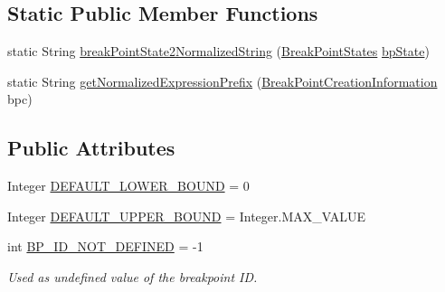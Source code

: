 \subsection*{Static Public Member Functions}
\begin{DoxyCompactItemize}
\item 
static String \hyperlink{classgov_1_1nasa_1_1jpf_1_1inspector_1_1client_1_1commands_1_1_cmd_breakpoint_create_1_1_console_breakpoint_creation_expression_a4ce446ae4313e893c81b66d39ba144a2}{break\+Point\+State2\+Normalized\+String} (\hyperlink{enumgov_1_1nasa_1_1jpf_1_1inspector_1_1interfaces_1_1_break_point_states}{Break\+Point\+States} \hyperlink{classgov_1_1nasa_1_1jpf_1_1inspector_1_1client_1_1commands_1_1_cmd_breakpoint_create_1_1_console_breakpoint_creation_expression_adb662e43ca08e3ea6852f1af80502ff6}{bp\+State})
\item 
static String \hyperlink{classgov_1_1nasa_1_1jpf_1_1inspector_1_1client_1_1commands_1_1_cmd_breakpoint_create_1_1_console_breakpoint_creation_expression_a034dc56e18b68f32311255d6139febe9}{get\+Normalized\+Expression\+Prefix} (\hyperlink{interfacegov_1_1nasa_1_1jpf_1_1inspector_1_1interfaces_1_1_break_point_creation_information}{Break\+Point\+Creation\+Information} bpc)
\end{DoxyCompactItemize}
\subsection*{Public Attributes}
\begin{DoxyCompactItemize}
\item 
Integer \hyperlink{interfacegov_1_1nasa_1_1jpf_1_1inspector_1_1interfaces_1_1_break_point_creation_information_a40131b93f82a84ed5322c4dc5ca4175e}{D\+E\+F\+A\+U\+L\+T\+\_\+\+L\+O\+W\+E\+R\+\_\+\+B\+O\+U\+ND} = 0
\item 
Integer \hyperlink{interfacegov_1_1nasa_1_1jpf_1_1inspector_1_1interfaces_1_1_break_point_creation_information_af917e7de77b2a6fc93c24e1c5a4a5759}{D\+E\+F\+A\+U\+L\+T\+\_\+\+U\+P\+P\+E\+R\+\_\+\+B\+O\+U\+ND} = Integer.\+M\+A\+X\+\_\+\+V\+A\+L\+UE
\item 
int \hyperlink{interfacegov_1_1nasa_1_1jpf_1_1inspector_1_1interfaces_1_1_break_point_creation_information_a24626231e3744e59f505d0731d4ca9e1}{B\+P\+\_\+\+I\+D\+\_\+\+N\+O\+T\+\_\+\+D\+E\+F\+I\+N\+ED} = -\/1
\begin{DoxyCompactList}\small\item\em Used as undefined value of the breakpoint ID. \end{DoxyCompactList}\end{DoxyCompactItemize}
